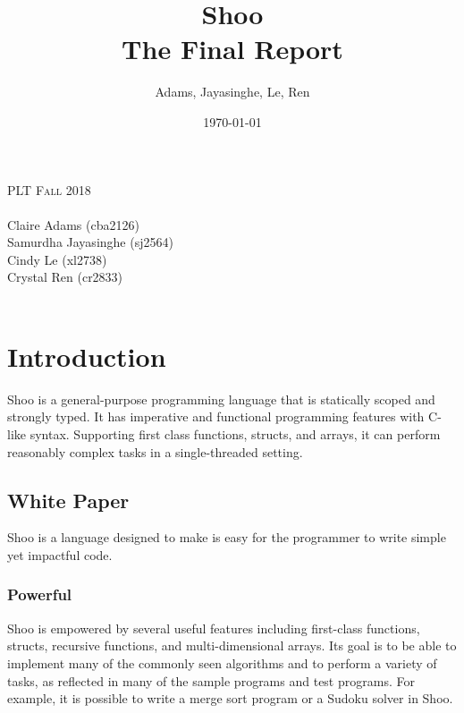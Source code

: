 \documentclass[12pt]{article}
\title{Shoo \\ \vspace{3mm}
\large The Final Report}							%
\author{Adams, Jayasinghe, Le, Ren}			%
\date{\today}									%
\makeatletter
\let\thetitle\@title
\let\thedate\@date
\makeatother
\begin{document}

\begin{titlepage}
	\centering
    \vspace*{0.5 cm}
    \textsc{\large PLT Fall 2018}\\[2.0 cm]	%
	{ \huge \bfseries \thetitle}\\
	\bigskip
    Claire Adams (cba2126) \\
    Samurdha Jayasinghe (sj2564) \\
    Cindy Le (xl2738) \\
    Crystal Ren (cr2833) \\
	\bigskip
	{\large \thedate}\\[2 cm]
 
	\vfill
	
\end{titlepage}

\makeatletter
\renewcommand{\l@subsection}{\@dottedtocline{2}{2.0em}{2.5em}}
\renewcommand{\l@subsubsection}{\@dottedtocline{2}{3.4em}{5em}}
\makeatother
\tableofcontents


\pagebreak


\section{Introduction}
Shoo is a general-purpose programming language that is statically scoped and strongly typed. It has imperative and functional programming features with C-like syntax.  Supporting first class functions, structs, and arrays, it can perform reasonably complex tasks in a single-threaded setting.

\subsection{White Paper}
Shoo is a language designed to make is easy for the programmer to write simple yet impactful code.

\subsubsection{Powerful}
Shoo is empowered by several useful features including first-class functions, structs, recursive functions, and multi-dimensional arrays. Its goal is to be able to implement many of the commonly seen algorithms and to perform a variety of tasks, as reflected in many of the sample programs and test programs. For example, it is possible to write a merge sort program or a Sudoku solver in Shoo.
\end{document}
